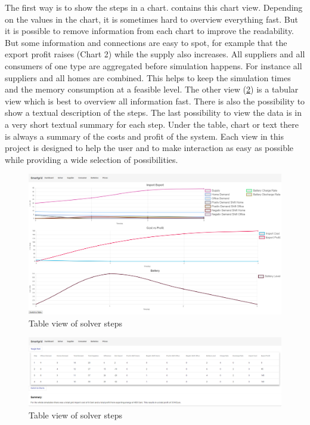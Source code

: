 The first way is to show the steps in a chart.  contains this chart view. Depending on the values in the chart, it is sometimes hard to overview everything fast. But it is possible to remove information from each chart to improve the readability. But some information and connections are easy to spot, for example that the export profit raises (Chart 2) while the supply also increases. All suppliers and all consumers of one type are aggregated before simulation happens. For instance all suppliers and all homes are combined. This helps to keep the simulation times and the memory consumption at a feasible level. The other view (\cref{fig:solverTable}) is a tabular view which is best to overview all information fast.
There is also the possibility to show a textual description of the steps. The last possibility to view the data is in a very short textual summary for each step.
Under the table, chart or text there is always a summary of the costs and profit of the system.
Each view in this project is designed to help the user and to make interaction as easy as possible while providing a wide selection of possibilities.
\begin{figure}[!h]
	\centering
	\includegraphics[width=1.00\textwidth]{../figures/SolverChartsCut.png}
	\caption{Table view of solver steps}
	\label{fig:solverChats}
\end{figure}

\begin{figure}[!h]
    \centering
\includegraphics[width=1.00\textwidth]{../figures/SolverTableCut.png}
    \caption{Table view of solver steps}
    \label{fig:solverTable}
\end{figure}